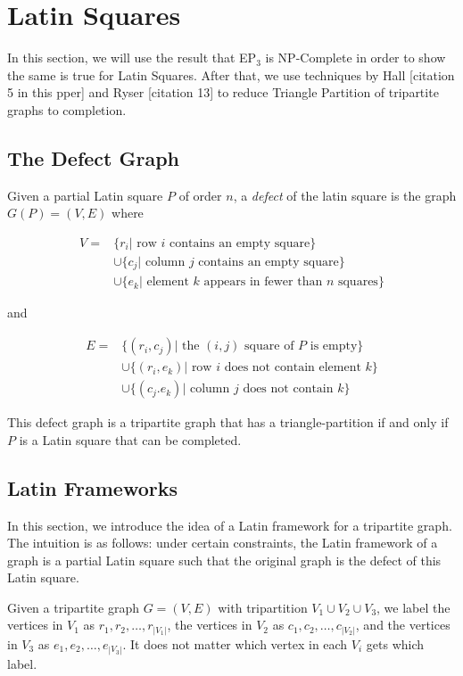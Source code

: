 \documentclass[runningheads,a4paper]{llncs}
\begin{document}
\section{Latin Squares}

In this section, we will use the result that EP$_3$ is NP-Complete in order to show the same is true for Latin Squares. After that, we use techniques by Hall [citation 5 in this pper] and Ryser [citation 13] to reduce Triangle Partition of tripartite graphs to completion.

\subsection{The Defect Graph}

Given a partial Latin square $P$ of order $n$, a \emph{defect} of the latin square is the graph $G(P) = (V,E)$ where

\begin{align*}
V = &\{r_i | \text{ row }i\text{ contains an empty square}\} \\
&\cup \{c_j | \text{ column }j\text{ contains an empty square}\} \\
&\cup \{e_k | \text{ element }k\text{ appears in fewer than }n\text{ squares}\}
\end{align*}

and

\begin{align*}
E = &\{(r_i,c_j) | \text{ the }(i,j)\text{ square of }P\text{ is empty}\} \\
&\cup \{(r_i,e_k) | \text{ row }i\text{ does not contain element }k\} \\
&\cup \{(c_j.e_k) | \text{ column }j\text{ does not contain }k\}
\end{align*}

This defect graph is a tripartite graph that has a triangle-partition if and only if $P$ is a Latin square that can be completed.

\subsection{Latin Frameworks}

In this section, we introduce the idea of a Latin framework for a tripartite graph. The intuition is as follows: under certain constraints, the Latin framework of a graph is a partial Latin square such that the original graph is the defect of this Latin square.

Given a tripartite graph $G = (V,E)$ with tripartition $V_1 \cup V_2 \cup V_3$, we label the vertices in $V_1$ as $r_1,r_2,\dots,r_{|V_1|}$, the vertices in $V_2$ as $c_1,c_2,\dots,c_{|V_2|}$, and the vertices in $V_3$ as $e_1,e_2,\dots,e_{|V_3|}$. It does not matter which vertex in each $V_i$ gets which label.
\end{document}
